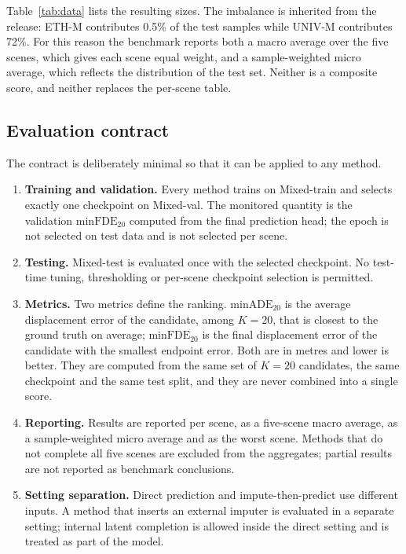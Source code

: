 Table~\ref{tab:data} lists the resulting sizes. The imbalance is inherited from the release: ETH-M contributes 0.5\% of the test samples while UNIV-M contributes 72\%. For this reason the benchmark reports both a macro average over the five scenes, which gives each scene equal weight, and a sample-weighted micro average, which reflects the distribution of the test set. Neither is a composite score, and neither replaces the per-scene table.

\subsection{Evaluation contract}
\label{sec:contract}

The contract is deliberately minimal so that it can be applied to any method.
\begin{enumerate}
\item \textbf{Training and validation.} Every method trains on Mixed-train and selects exactly one checkpoint on Mixed-val. The monitored quantity is the validation $\mathrm{minFDE}_{20}$ computed from the final prediction head; the epoch is not selected on test data and is not selected per scene.
\item \textbf{Testing.} Mixed-test is evaluated once with the selected checkpoint. No test-time tuning, thresholding or per-scene checkpoint selection is permitted.
\item \textbf{Metrics.} Two metrics define the ranking. $\mathrm{minADE}_{20}$ is the average displacement error of the candidate, among $K=20$, that is closest to the ground truth on average; $\mathrm{minFDE}_{20}$ is the final displacement error of the candidate with the smallest endpoint error. Both are in metres and lower is better. They are computed from the same set of $K=20$ candidates, the same checkpoint and the same test split, and they are never combined into a single score.
\item \textbf{Reporting.} Results are reported per scene, as a five-scene macro average, as a sample-weighted micro average and as the worst scene. Methods that do not complete all five scenes are excluded from the aggregates; partial results are not reported as benchmark conclusions.
\item \textbf{Setting separation.} Direct prediction and impute-then-predict use different inputs. A method that inserts an external imputer is evaluated in a separate setting; internal latent completion is allowed inside the direct setting and is treated as part of the model.
\end{enumerate}

